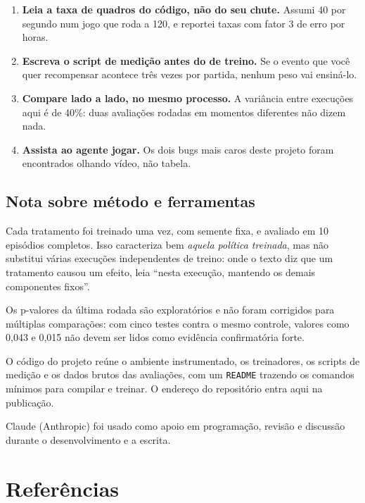\documentclass[10pt,a4paper,twoside,twocolumn]{scrartcl}
\providecommand{\tightlist}{%
  \setlength{\itemsep}{0pt}\setlength{\parskip}{0pt}}
\let\oldtexttt\texttt
\renewcommand{\texttt}[1]{{\small\oldtexttt{#1}}}
\begin{document}
\begin{enumerate}
\def\labelenumi{\arabic{enumi}.}
\tightlist
\item
  \textbf{Leia a taxa de quadros do código, não do seu chute.} Assumi 40
  por segundo num jogo que roda a 120, e reportei taxas com fator 3 de
  erro por horas.
\item
  \textbf{Escreva o script de medição antes do de treino.} Se o evento
  que você quer recompensar acontece três vezes por partida, nenhum peso
  vai ensiná-lo.
\item
  \textbf{Compare lado a lado, no mesmo processo.} A variância entre
  execuções aqui é de 40\%: duas avaliações rodadas em momentos
  diferentes não dizem nada.
\item
  \textbf{Assista ao agente jogar.} Os dois bugs mais caros deste
  projeto foram encontrados olhando vídeo, não tabela.
\end{enumerate}

\subsection{Nota sobre método e
ferramentas}\label{nota-sobre-muxe9todo-e-ferramentas}

Cada tratamento foi treinado uma vez, com semente fixa, e avaliado em 10
episódios completos. Isso caracteriza bem \emph{aquela política
treinada}, mas não substitui várias execuções independentes de treino:
onde o texto diz que um tratamento causou um efeito, leia ``nesta
execução, mantendo os demais componentes fixos''.

Os p-valores da última rodada são exploratórios e não foram corrigidos
para múltiplas comparações: com cinco testes contra o mesmo controle,
valores como 0,043 e 0,015 não devem ser lidos como evidência
confirmatória forte.

O código do projeto reúne o ambiente instrumentado, os treinadores, os
scripts de medição e os dados brutos das avaliações, com um
\texttt{README} trazendo os comandos mínimos para compilar e treinar. O
endereço do repositório entra aqui na publicação.

Claude (Anthropic) foi usado como apoio em programação, revisão e
discussão durante o desenvolvimento e a escrita.

\section{Referências}\label{referuxeancias}
\end{document}
